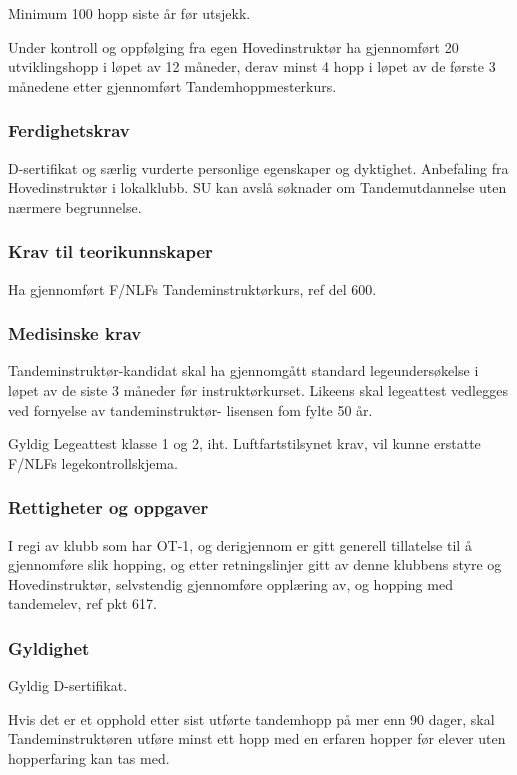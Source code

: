 Minimum 100 hopp siste år før utsjekk.

Under kontroll og oppfølging fra egen Hovedinstruktør ha gjennomført 20 utviklingshopp i løpet av 12 måneder, derav minst 4 hopp i løpet av de første 3 månedene etter gjennomført Tandemhoppmesterkurs.

\subsubsection{Ferdighetskrav}
D-sertifikat og særlig vurderte personlige egenskaper og dyktighet. Anbefaling fra Hovedinstruktør i lokalklubb. SU kan avslå søknader om Tandemutdannelse uten nærmere begrunnelse.

\subsubsection{Krav til teorikunnskaper}
Ha gjennomført F/NLFs Tandeminstruktørkurs, ref del 600.

\subsubsection{Medisinske krav}
Tandeminstruktør-kandidat skal ha gjennomgått standard legeundersøkelse i løpet av de siste 3 måneder før instruktørkurset. Likeens skal legeattest vedlegges ved fornyelse av tandeminstruktør- lisensen fom fylte 50 år.

Gyldig Legeattest klasse 1 og 2, iht. Luftfartstilsynet krav, vil kunne erstatte F/NLFs legekontrollskjema.

\subsubsection{Rettigheter og oppgaver}
I regi av klubb som har OT-1, og derigjennom er gitt generell tillatelse til å gjennomføre slik hopping, og etter retningslinjer gitt av denne klubbens styre og Hovedinstruktør, selvstendig gjennomføre opplæring av, og hopping med tandemelev, ref pkt 617.

\subsubsection{Gyldighet}
Gyldig D-sertifikat.

Hvis det er et opphold etter sist utførte tandemhopp på mer enn 90 dager, skal Tandeminstruktøren utføre minst ett hopp med en erfaren hopper før elever uten hopperfaring kan tas med.

